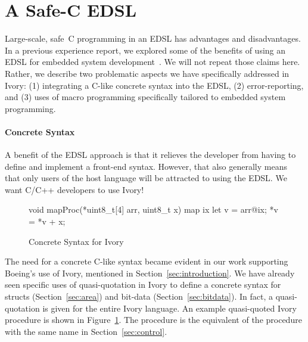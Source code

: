 \section{A Safe-C EDSL}
\label{sec:edsl}

Large-scale, safe~C programming in an EDSL has advantages and disadvantages. In
a previous experience report, we explored some of the benefits of using an EDSL
for embedded system development~\cite{smaccm}. We will not repeat those claims
here. Rather, we describe two problematic aspects we have specifically addressed
in Ivory: (1) integrating a C-like concrete syntax into the EDSL, (2)
error-reporting, and (3) uses of macro programming specifically tailored to
embedded system programming.

\paragraph{Concrete Syntax}

A benefit of the EDSL approach is that it relieves the developer from having to
define and implement a front-end syntax. However, that also generally means that
only users of the host language will be attracted to using the
EDSL. We want C/C++ developers to use Ivory!

\begin{figure}[h!]
\begin{code}
void mapProc(*uint8_t[4] arr, uint8_t x) {
  map ix {
    let v = arr@ix;
    *v = *v + x;
  }
}
\end{code}
  \caption{Concrete Syntax for Ivory}
  \label{fig:concrete}
\end{figure}


The need for a concrete C-like syntax became evident in our work supporting
Boeing's use of Ivory, mentioned in Section~\ref{sec:introduction}. We have
already seen specific uses of quasi-quotation in Ivory to define a concrete
syntax for structs (Section~\ref{sec:area}) and bit-data
(Section~\ref{sec:bitdata}). In fact, a quasi-quotation is given for the entire
Ivory language. An example quasi-quoted Ivory procedure is shown in
Figure~\ref{fig:concrete}. The procedure is the equivalent of the procedure with
the same name in Section~\ref{sec:control}.

